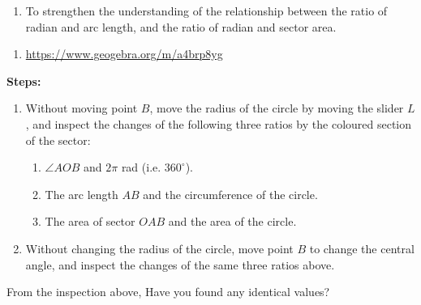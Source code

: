 \documentclass{report}
\begin{document}
\begin{explore}
        
        \begin{enumerate}[label=\textbf{Aim:} ,leftmargin=4.4em]
            \item To strengthen the understanding of the relationship between the ratio of radian and arc length, and the ratio of radian and sector area.
        \end{enumerate}
        \vspace{-2em}
        \begin{enumerate}[label=\textbf{Tool:} ,leftmargin=2em, align=left]
            \item \url{https://www.geogebra.org/m/a4brp8yg}
        \end{enumerate}
        \vspace{-1em}
        
        \textbf{Steps:}
        \vspace{-1em}
        \begin{enumerate}
            \item Without moving point $B$, move the radius of the circle by moving the slider $L$, and inspect the changes of the following three ratios by the coloured section of the sector:
            \begin{enumerate}[label=(\arabic*)]
                \item $\angle AOB$ and $2\pi$ rad (i.e. $360^\circ$).
                \item The arc length $AB$ and the circumference of the circle.
                \item The area of sector $OAB$ and the area of the circle.
            \end{enumerate}
            \item Without changing the radius of the circle, move point $B$ to change the central angle, and inspect the changes of the same three ratios above.
        \end{enumerate}

        From the inspection above, Have you found any identical values?
\end{explore}

\newpage
\end{document}
